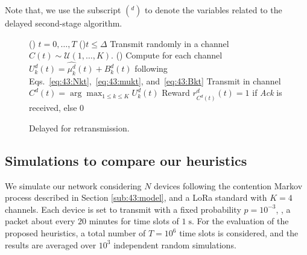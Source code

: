 Note that, we use the subscript $({}^d)$ to denote the variables
related to the delayed second-stage \UCB{} algorithm.

\vspace*{-3pt}
	\begin{figure}[h!]
		\centering
		\begin{algorithm}[H]
			\For()
			{$t = 0, \dots, T$}{
				\uElseIf(){$t \leq \Delta$}{
					Transmit randomly in a channel $C(t) \sim \mathcal{U}(1,\ldots,K)$.
				}
				\Else(){
					Compute for each channel $ U^d_k(t) = \widehat{\mu^d_k}(t) + B^d_k(t)$ following Eqs.~\eqref{eq:43:Nkt},~\eqref{eq:43:mukt}, and~\eqref{eq:43:Bkt}\;
					Transmit in channel $C^d(t) = \arg\max_{1\leq k \leq K} U^d_k(t)$\;
					Reward $r^d_{C^d(t)}(t) = 1$ if \emph{Ack} is received, else $0$\;
				}
			}
			\caption{Delayed \UCB{} for retransmission.}
			\label{algo:43:UCBwithDelay}
		\end{algorithm}
	\end{figure}


\subsection{Simulations to compare our heuristics}
\label{sub:43:numExp}

We simulate our network considering $N$ devices following the contention Markov process described in Section \ref{sub:43:model}, and a LoRa standard with $K=4$ channels.
Each device is set to transmit with a fixed probability $p=10^{-3}$, \ie, a packet about every $20$ minutes for time slots of $1\;\mathrm{s}$.
%
For the evaluation of the proposed heuristics, a total number of $T=10^{6}$ time slots is considered, and the results are averaged over $10^{3}$ independent random simulations.

